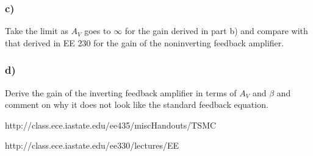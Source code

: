 \documentclass[10pt,a4paper]{article}
\begin{document}
\subsubsection*{c)}
Take the limit as \(A_V\) goes to $\infty$ for the gain derived in part b) and compare with
that derived in EE 230 for the gain of the noninverting feedback amplifier.

\subsubsection*{d)}
Derive the gain of the inverting feedback amplifier in terms of \(A_V\) and \(\beta\) and
comment on why it does not look like the standard feedback equation.




http://class.ece.iastate.edu/ee435/miscHandouts/TSMC%

http://class.ece.iastate.edu/ee330/lectures/EE%
\end{document}
